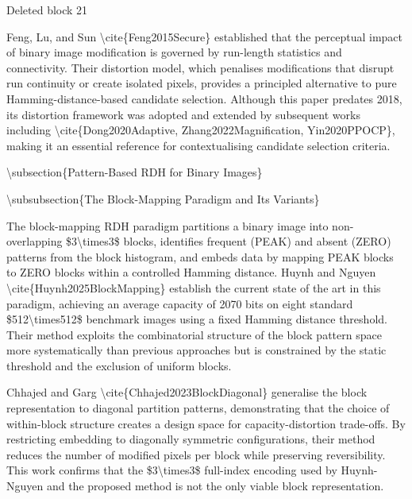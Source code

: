\documentclass[a4paper,fleqn]{cas-dc}
\newenvironment{RevisionDeletion}{%
  \par\begingroup\color{revisionred}\footnotesize\ttfamily
  \setlength{\parindent}{0pt}\setlength{\parskip}{1pt}\obeyspaces
}{\par\endgroup}
\begin{document}
\begin{RevisionDeletion}
Deleted block 21\par
Feng, Lu, and Sun \textbackslash{}cite\{Feng2015Secure\} established that the perceptual impact of binary image modification is governed by run-length statistics and connectivity. Their distortion model, which penalises modifications that disrupt run continuity or create isolated pixels, provides a principled alternative to pure Hamming-distance-based candidate selection. Although this paper predates 2018, its distortion framework was adopted and extended by subsequent works including \textbackslash{}cite\{Dong2020Adaptive, Zhang2022Magnification, Yin2020PPOCP\}, making it an essential reference for contextualising candidate selection criteria.\par
\par
\textbackslash{}subsection\{Pattern-Based RDH for Binary Images\}\par
\par
\textbackslash{}subsubsection\{The Block-Mapping Paradigm and Its Variants\}\par
\par
The block-mapping RDH paradigm partitions a binary image into non-overlapping \$3\textbackslash{}times3\$ blocks, identifies frequent (PEAK) and absent (ZERO) patterns from the block histogram, and embeds data by mapping PEAK blocks to ZERO blocks within a controlled Hamming distance. Huynh and Nguyen \textbackslash{}cite\{Huynh2025BlockMapping\} establish the current state of the art in this paradigm, achieving an average capacity of 2070 bits on eight standard \$512\textbackslash{}times512\$ benchmark images using a fixed Hamming distance threshold. Their method exploits the combinatorial structure of the block pattern space more systematically than previous approaches but is constrained by the static threshold and the exclusion of uniform blocks.\par
\par
Chhajed and Garg \textbackslash{}cite\{Chhajed2023BlockDiagonal\} generalise the block representation to diagonal partition patterns, demonstrating that the choice of within-block structure creates a design space for capacity-distortion trade-offs. By restricting embedding to diagonally symmetric configurations, their method reduces the number of modified pixels per block while preserving reversibility. This work confirms that the \$3\textbackslash{}times3\$ full-index encoding used by Huynh-Nguyen and the proposed method is not the only viable block representation.\par

\end{RevisionDeletion}
\end{document}

